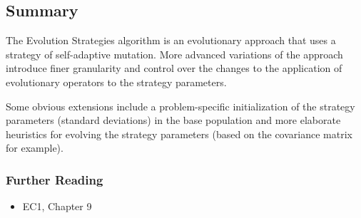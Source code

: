 \subsection{Summary}
The Evolution Strategies algorithm is an evolutionary approach that uses a strategy of self-adaptive mutation. More advanced variations of the approach introduce finer granularity and control over the changes to the application of evolutionary operators to the strategy parameters.

Some obvious extensions include a problem-specific initialization of the strategy parameters (standard deviations) in the base population and more elaborate heuristics for evolving the strategy parameters (based on the covariance matrix for example).

\subsubsection{Further Reading}

\begin{itemize}
	\item EC1, Chapter 9
\end{itemize}
